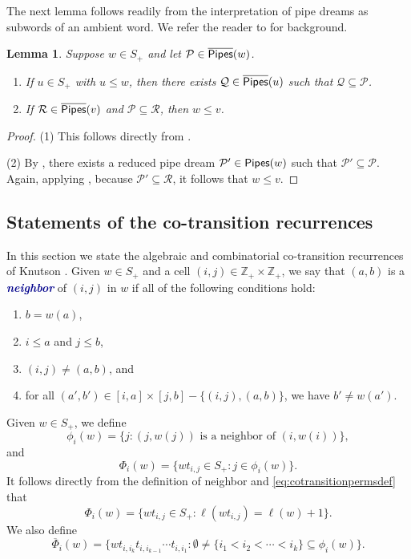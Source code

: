 \documentclass[12 pt]{amsart}
\newcommand{\newword}[1]{\textcolor{darkblue}{\textbf{\emph{#1}}}}
\newtheorem{lemma}[Theorem]{Lemma}
\numberwithin{equation}{section}
\theoremstyle{remark}
\newcommand{\pipes}{{\sf Pipes}}
\newcommand{\kpipes}{\overline{\sf Pipes}}
\newcommand{\cotransitionperms}{\Phi}
\newcommand{\cotransitionindices}{\phi}
\newcommand{\kcotransitionperms}{\overline{\Phi}}
\begin{document}
		The next lemma follows readily from the interpretation of pipe dreams as subwords of an ambient word. We refer the reader to \cite{Knutson.Miller:subword} for background.
		
		\begin{lemma}
			\label{lemma:subpipedream}
			Suppose $w \in S_{+} $ and let $\mathcal{P} \in \kpipes(w)$.
			\begin{enumerate}
				\item If $u \in S_{+} $ with $u\leq w$, then there exists $\mathcal{Q} \in \kpipes(u)$ such that $\mathcal{Q} \subseteq \mathcal{P}$.
				\item If $\mathcal{R} \in \kpipes(v)$ and $\mathcal{P} \subseteq \mathcal{R}$, then $w\leq v$.
			\end{enumerate}
		\end{lemma}
		\begin{proof}
			\noindent (1) This follows directly from \cite[Lemma 3.4]{Knutson.Miller:subword}.
			
			\noindent (2) By \cite[Lemma 3.4]{Knutson.Miller:subword}, there exists a reduced pipe dream $\mathcal{P}' \in \pipes(w)$ such that $\mathcal{P}' \subseteq \mathcal{P}$. 
			Again, applying \cite[Lemma 3.4]{Knutson.Miller:subword}, because $\mathcal{P}' \subseteq \mathcal{R}$, it follows that $w\leq v$.
		\end{proof}
				
		\subsection{Statements of the co-transition recurrences}
		
		In this section we state the algebraic and combinatorial co-transition recurrences of Knutson \cite{Knutson:cotransition}.
		Given $w \in S_{+} $ and a cell $(i,j) \in \mathbb{Z}_{+} \times \mathbb{Z}_{+}$, we say that $(a,b)$ is a \newword{neighbor} of $(i,j)$ in $w$ if all of the following conditions hold:
		\begin{enumerate}
			\item $b = w(a)$,
			\item $i \leq a$ and $j \leq b$,
			\item $(i,j) \neq (a,b)$, and
			\item for all $(a',b') \in [i,a] \times [j,b] - \{(i,j),(a,b)\}$, we have $b' \neq w(a')$.
		\end{enumerate}
		Given $w \in S_{+} $, we define
		\begin{equation}
			\cotransitionindices_i(w) = \{j : (j, w(j)) \text{ is a neighbor of } (i, w(i))\},
		\end{equation}
		and
		\begin{equation}
			\label{eq:cotransitionpermsdef}
			\cotransitionperms_i(w) = \{wt_{i,j} \in S_{+} : j \in\cotransitionindices_i(w)\}.
		\end{equation}
		It follows directly from the definition of neighbor and \cref{eq:cotransitionpermsdef} that 
		\[\cotransitionperms_i(w) = \{wt_{i,j} \in S_{+} : \ell(w t_{i,j}) = \ell(w) + 1\}.\]
		We also define 
		\[\kcotransitionperms_i(w) = \{wt_{i,i_k}t_{i,i_{k-1}}\cdots t_{i,i_1}:\emptyset \neq \{i_1 < i_2 < \cdots < i_k\} \subseteq \cotransitionindices_i(w)\}.\]
		
\end{document}

